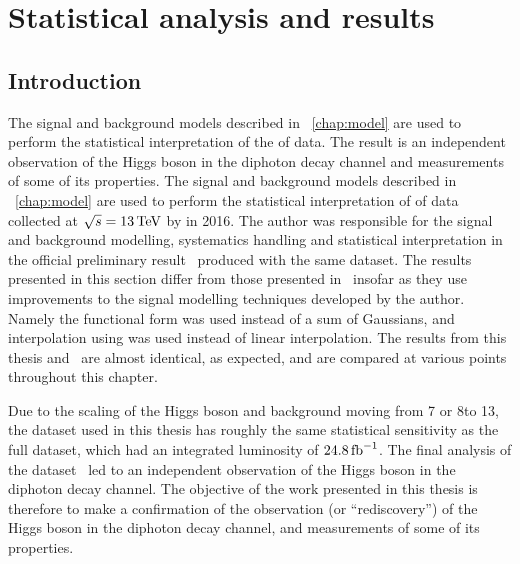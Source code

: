 \chapter{Statistical analysis and results}
\label{chap:statandresults}

\section{Introduction}
\label{sec:statandresults:Intro}

\ifNewAnalysis
The signal and background models described in \Chapter~\ref{chap:model} are used to perform the statistical interpretation of the \thisanalysislumi\ifb of data. The result is an independent observation of the Higgs boson in the diphoton decay channel and measurements of some of its properties. %
\else
The signal and background models described in \Chapter~\ref{chap:model} are used to perform the statistical interpretation of \thisanalysislumi\ifb of \RunII data collected at $\sqrt{s}=13\,\text{Te\hspace{-.08em}V}$ by \CMS in 2016. The author was responsible for the signal and background modelling, systematics handling and statistical interpretation in the official \CMS preliminary result~\cite{CMS-PAS-HIG-16-020} produced with the same dataset. The results presented in this section differ from those presented in~\cite{CMS-PAS-HIG-16-020} insofar as they use improvements to the signal modelling techniques developed by the author. Namely the \DCBpG functional form was used instead of a sum of Gaussians, and interpolation using \SSF was used instead of linear interpolation. The results from this thesis and~\cite{CMS-PAS-HIG-16-020} are almost identical, as expected, and are compared at various points throughout this chapter.

Due to the scaling of the \SM Higgs boson and background \crosssection\s moving from 7 or 8\TeV to 13\TeV, the dataset used in this thesis has roughly the same statistical sensitivity as the full \RunI dataset, which had an integrated luminosity of $24.8\,\text{fb}^{-1}$. The final analysis of the \RunI dataset~\cite{LegacyHgg} led to an independent observation of the Higgs boson in the diphoton decay channel. The objective of the work presented in this thesis is therefore to make a confirmation of the observation (or ``rediscovery'') of the Higgs boson in the diphoton decay channel, and measurements of some of its properties.
\fi

